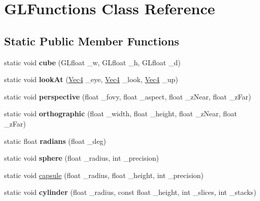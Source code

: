 \hypertarget{classGLFunctions}{\section{G\-L\-Functions Class Reference}
\label{classGLFunctions}
}
\subsection*{Static Public Member Functions}
\begin{DoxyCompactItemize}
\item 
\hypertarget{classGLFunctions_ab92c07964bf3b5c1459a68e47874d9d4}{static void {\bfseries cube} (G\-Lfloat \-\_\-w, G\-Lfloat \-\_\-h, G\-Lfloat \-\_\-d)}\label{classGLFunctions_ab92c07964bf3b5c1459a68e47874d9d4}

\item 
\hypertarget{classGLFunctions_aa39dce57b78e89c63d1f4178d4ece2e3}{static void {\bfseries look\-At} (\hyperlink{classVec4}{Vec4} \-\_\-eye, \hyperlink{classVec4}{Vec4} \-\_\-look, \hyperlink{classVec4}{Vec4} \-\_\-up)}\label{classGLFunctions_aa39dce57b78e89c63d1f4178d4ece2e3}

\item 
\hypertarget{classGLFunctions_a5099e8a045d3531946fd609a68a9b240}{static void {\bfseries perspective} (float \-\_\-fovy, float \-\_\-aspect, float \-\_\-z\-Near, float \-\_\-z\-Far)}\label{classGLFunctions_a5099e8a045d3531946fd609a68a9b240}

\item 
\hypertarget{classGLFunctions_a5582adb4f64d94564b0facc2ce88530f}{static void {\bfseries orthographic} (float \-\_\-width, float \-\_\-height, float \-\_\-z\-Near, float \-\_\-z\-Far)}\label{classGLFunctions_a5582adb4f64d94564b0facc2ce88530f}

\item 
\hypertarget{classGLFunctions_acc960c554d73ac346656f19c5cb24abe}{static float {\bfseries radians} (float \-\_\-deg)}\label{classGLFunctions_acc960c554d73ac346656f19c5cb24abe}

\item 
\hypertarget{classGLFunctions_aacaf6e574b5736a0560fc6ec194646d4}{static void {\bfseries sphere} (float \-\_\-radius, int \-\_\-precision)}\label{classGLFunctions_aacaf6e574b5736a0560fc6ec194646d4}

\item 
static void \hyperlink{classGLFunctions_a6f2d4c4c3f5d69b365dffcef7f46654b}{capsule} (float \-\_\-radius, float \-\_\-height, int \-\_\-precision)
\item 
\hypertarget{classGLFunctions_ab67c95f46f99bbb79c081dd83feff020}{static void {\bfseries cylinder} (float \-\_\-radius, const float \-\_\-height, int \-\_\-slices, int \-\_\-stacks)}\label{classGLFunctions_ab67c95f46f99bbb79c081dd83feff020}


\end{DoxyCompactItemize}

